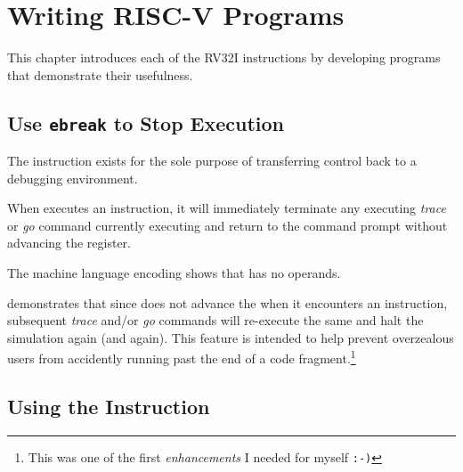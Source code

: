 \chapter{Writing RISC-V Programs}

%
This chapter introduces each of the RV32I instructions by developing programs 
that demonstrate their usefulness.


\section{Use {\tt ebreak} to Stop \rvddt{} Execution}

The  instruction exists for the sole purpose of transferring control back 
to a debugging environment.\cite[p.~24]{rvismv1v22:2017}

When \rvddt{} executes an  instruction, it will immediately terminate any
executing {\em trace} or {\em go} command currently executing and return to the
command prompt without advancing the  register.  

The machine language encoding shows that  has no operands.


 demonstrates that since \rvddt{} does 
not advance the  when it encounters an  instruction, 
subsequent {\em trace} and/or {\em go} commands will re-execute the same  
and halt the simulation again (and again).  
This feature is intended to help prevent overzealous users from accidently 
running past the end of a code fragment.\footnote{This was one of the first {\em enhancements}
I needed for myself \tt:-)}




\section{Using the  Instruction}

